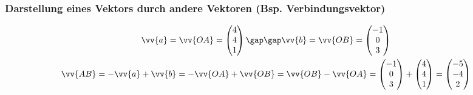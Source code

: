 \subsubsection{Darstellung eines Vektors durch andere Vektoren (Bsp. Verbindungsvektor)}
\begin{gather*}
  \vv{a} = \vv{OA} = \begin{pmatrix}4 \\ 4 \\ 1\end{pmatrix} \gap\gap \vv{b} = \vv{OB} = \begin{pmatrix}-1 \\ 0 \\ 3\end{pmatrix} \\
  \vv{AB} = -\vv{a} + \vv{b} = -\vv{OA} + \vv{OB} = \vv{OB} - \vv{OA} = \begin{pmatrix}-1 \\ 0 \\ 3\end{pmatrix} + \begin{pmatrix}4 \\ 4 \\ 1\end{pmatrix} = \begin{pmatrix}-5 \\ -4 \\ 2\end{pmatrix}
\end{gather*}
